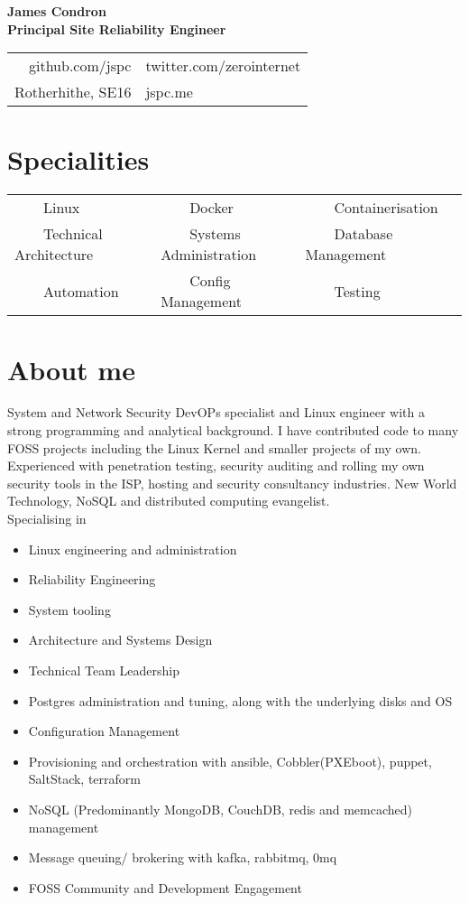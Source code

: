 \documentclass[11pt,a4paper,sans]{article}
\newcommand{\tabitem}{~~\llap{\textbullet}~~}
\begin{document}
\begin{center}
  {\huge\textbf{James Condron}}\\
  \textbf{Principal Site Reliability Engineer} \\

  \begin{tabular}{rl}
    github.com/jspc &twitter.com/zerointernet\\
    Rotherhithe, SE16 &jspc.me
  \end{tabular}
\end{center}

\section{Specialities}
\begin{tabular}{lll}
\tabitem Linux & \tabitem Docker & \tabitem Containerisation \\
\tabitem Technical Architecture & \tabitem Systems Administration & \tabitem Database Management \\
\tabitem Automation & \tabitem Config Management & \tabitem Testing \\
\end{tabular}

\section{About me}
System and Network Security DevOPs specialist and Linux engineer with a strong programming and analytical background. I have contributed code to many FOSS projects including the Linux Kernel and smaller projects of my own. Experienced with penetration testing, security auditing and rolling my own security tools in the ISP, hosting and security consultancy industries. New World Technology, NoSQL and distributed computing evangelist.
\\
Specialising in

\begin{itemize}
\item Linux engineering and administration
\item Reliability Engineering
\item System tooling
\item Architecture and Systems Design
\item Technical Team Leadership
\item Postgres administration and tuning, along with the underlying disks and OS
\item Configuration Management
\item Provisioning and orchestration with ansible, Cobbler(PXEboot), puppet, SaltStack, terraform
\item NoSQL (Predominantly MongoDB, CouchDB, redis and memcached) management
\item Message queuing/ brokering with kafka, rabbitmq, 0mq
\item FOSS Community and Development Engagement
\end{itemize}
\end{document}
